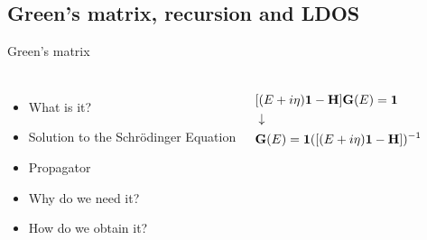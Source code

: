 \documentclass[hyperref={colorlinks=true,urlcolor=blue,linkcolor=.},aspectratio=1610,mathserif]{beamer}
\begin{document}
\subsection{Green's matrix, recursion and LDOS}

\begin{frame}{Green's matrix}
	\begin{center}
		\begin{columns}[c]
			\begin{itemize}
			    \item What is it? 
				\item Solution to the Schr\"{o}dinger Equation
				\item Propagator
				\item Why do we need it? 
				\item How do we obtain it?
			\end{itemize}
			\begin{align*}
				 & [(E+i\eta)\vb{1}-\vb{H}]\vb{G}(E)=\vb{1}        \\
				 & \downarrow                                      \\
				 & \vb{G}(E)=\vb{1}([(E+i\eta)\vb{1}-\vb{H}])^{-1}
			\end{align*}
		\end{columns}
	\end{center}
\end{frame}
\end{document}
